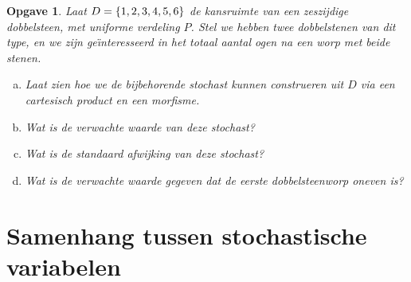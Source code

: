 \documentclass[a4paper]{book}
\newtheorem{exercise}[theorem]{Opgave}
\theoremstyle{definition}
\begin{document}
\begin{exercise}
    Laat $D = \set{1,2,3,4,5,6}$ de kansruimte van een zeszijdige dobbelsteen, met uniforme verdeling $P$.
    Stel we hebben twee dobbelstenen van dit type, en we zijn ge\"{\i}nteresseerd in het totaal aantal ogen na een worp met beide stenen.
    \begin{enumerate}[a.]
    \item Laat zien hoe we de bijbehorende stochast kunnen construeren uit $D$ via een cartesisch product en een morfisme.
    \item Wat is de verwachte waarde van deze stochast?
    \item Wat is de standaard afwijking van deze stochast?
    \item Wat is de verwachte waarde gegeven dat de eerste dobbelsteenworp oneven is?
    \end{enumerate}
\end{exercise}


\section{Samenhang tussen stochastische variabelen}
\end{document}
